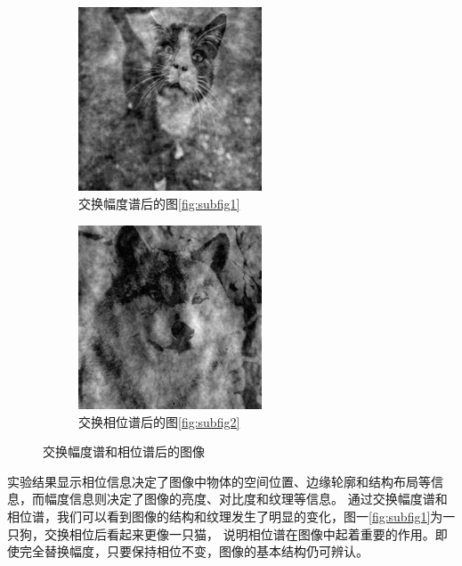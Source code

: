 \documentclass[UTF8]{article}
\begin{document}
\begin{figure}[htbp]
    \centering
    \begin{subfigure}{0.4\textwidth}
        \centering
        \includegraphics[width=0.6\textwidth]{../img/img1_2.jpg} %
        \caption{交换幅度谱后的图\ref{fig:subfig1}}
    \end{subfigure}
    \hfill
    \begin{subfigure}{0.4\textwidth}
        \centering
        \includegraphics[width=0.6\textwidth]{../img/img2_2.jpg}
        \caption{交换相位谱后的图\ref{fig:subfig2}}
    \end{subfigure}        
    \caption{交换幅度谱和相位谱后的图像}
\end{figure}
\newpage 实验结果显示相位信息决定了图像中物体的空间位置、边缘轮廓和结构布局等信息，而幅度信息则决定了图像的亮度、对比度和纹理等信息。
通过交换幅度谱和相位谱，我们可以看到图像的结构和纹理发生了明显的变化，图一\ref{fig:subfig1}为一只狗，交换相位后看起来更像一只猫，
说明相位谱在图像中起着重要的作用。即使完全替换幅度，只要保持相位不变，图像的基本结构仍可辨认。
\end{document}
